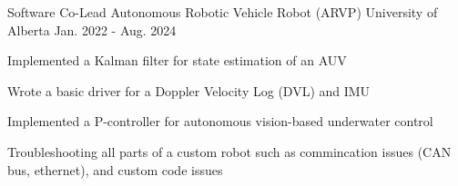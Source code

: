 

\begin{cventries}

  \cventry
    {Software Co-Lead} %
    {Autonomous Robotic Vehicle Robot (ARVP)} %
    {University of Alberta} %
    {Jan. 2022 - Aug. 2024} %
    {
      \begin{cvitems} %
        \item Implemented a Kalman filter for state estimation of an AUV
        \item Wrote a basic driver for a Doppler Velocity Log (DVL) and IMU
        \item Implemented a P-controller for autonomous vision-based underwater control
        \item Troubleshooting all parts of a custom robot such as commincation issues (CAN bus, ethernet), and custom code issues 
      \end{cvitems}
    }


\end{cventries}
